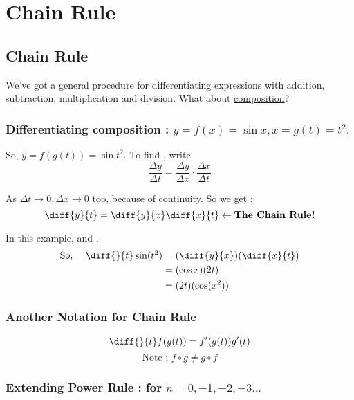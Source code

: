 

\chapter{Chain Rule}  

\bigbreak
\section{Chain Rule}

We've got a general procedure for differentiating expressions with addition, subtraction, multiplication and division.
What about \underline{composition}?

\subsection{Differentiating composition : $y = f(x) = \sin x , x = g(t) = t^2.$}

So, $y = f(g(t)) = \sin t^2$. To find , write
$$ \frac{\Delta y}{\Delta t} = \frac{\Delta y}{\Delta x} \cdot \frac{\Delta x}{\Delta t} $$

As $\Delta t \to 0, \Delta x \to 0$ too, because of continuity. So we get : 
$$ \diff{y}{t} = \diff{y}{x} \diff{x}{t} \leftarrow \textbf{The Chain Rule!} $$

In this example,  and .
\begin{align*}
	\text{So, $\quad$} \diff{}{t} \sin(t^2) 
		& = (\diff{y}{x})(\diff{x}{t}) \\
		& = (\cos x)(2t) \\
		& = (2t)(\cos(x^2)) \\
\end{align*}

\subsection{Another Notation for Chain Rule}

$$ \diff{}{t}f(g(t)) = f'(g(t))g'(t) $$
$$ \text{Note : } f \circ g \neq g \circ f $$

\subsection{Extending Power Rule :  for $n = 0, -1, -2, -3\ldots$}

